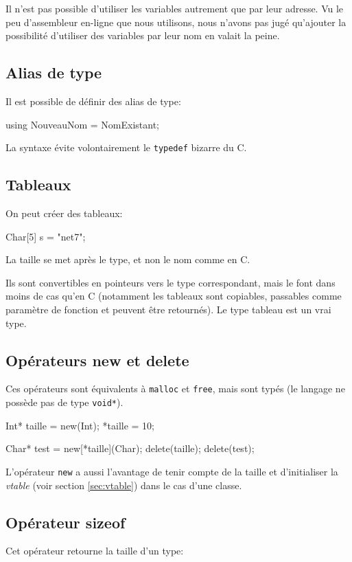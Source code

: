 \documentclass{scrartcl}
\begin{document}
    Il n'est pas possible d'utiliser les variables autrement que par leur
    adresse. Vu le peu d'assembleur en-ligne que nous utilisons, nous n'avons
    pas jugé qu'ajouter la possibilité d'utiliser des variables par leur nom en
    valait la peine.

  \subsection{Alias de type}\label{sec:alias}
    Il est possible de définir des alias de type:
    \begin{moccode}
using NouveauNom = NomExistant;
    \end{moccode}

    La syntaxe évite volontairement le \verb+typedef+ bizarre du C.

  \subsection{Tableaux}\label{sec:tab}
    On peut créer des tableaux:
    \begin{moccode}
Char[5] s = "net7";
    \end{moccode}

    La taille se met après le type, et non le nom comme en C.

    Ils sont convertibles en pointeurs vers le type correspondant, mais le font
    dans moins de cas qu'en C (notamment les tableaux sont copiables,
    passables comme paramètre de fonction et peuvent être retournés). Le type
    tableau est un vrai type.

  \subsection{Opérateurs new et delete}\label{sec:new}
    Ces opérateurs sont équivalents à \verb+malloc+ et \verb+free+, mais sont
    typés (le langage ne possède pas de type \verb+void*+).

    \begin{moccode}
Int* taille = new(Int);
*taille = 10;

Char* test = new[*taille](Char);
delete(taille);
delete(test);
    \end{moccode}

    L'opérateur \verb+new+ a aussi l'avantage de tenir compte de la taille et
    d'initialiser la \textit{vtable} (voir section \ref{sec:vtable}) dans le
    cas d'une classe.

  \subsection{Opérateur sizeof}
    Cet opérateur retourne la taille d'un type:
\end{document}
